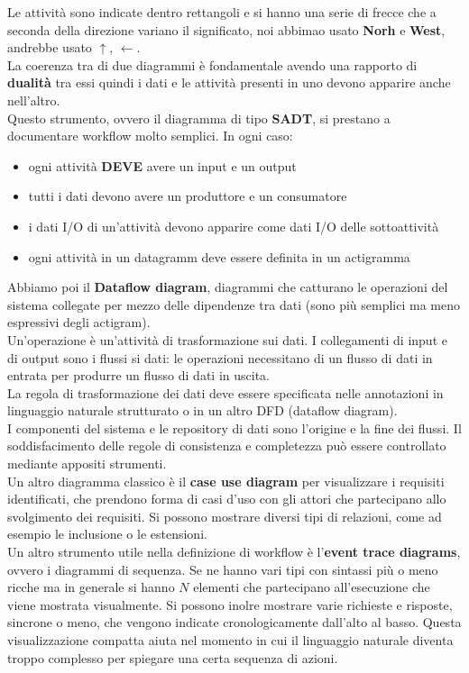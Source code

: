 Le attività sono indicate dentro rettangoli e si hanno una serie di frecce che a seconda della direzione variano il significato, noi abbimao usato \textbf{Norh} e \textbf{West}, andrebbe usato $\uparrow$, $\longleftarrow$.\\
La coerenza tra di due diagrammi è fondamentale avendo una rapporto di \textbf{dualità} tra essi quindi i dati e le attività presenti in uno devono apparire anche nell'altro.\\
Questo strumento, ovvero il diagramma di tipo \textbf{SADT}, si prestano a documentare workflow molto semplici. In ogni caso:
\begin{itemize}
    \item ogni attività \textbf{DEVE} avere un input e un output 
    \item tutti i dati devono avere un produttore e un consumatore 
    \item i dati I/O di un'attività devono apparire come dati I/O delle sottoattività 
    \item ogni attività in un datagramm deve essere definita in un actigramma
\end{itemize}

Abbiamo poi il \textbf{Dataflow diagram}, diagrammi che catturano le operazioni del sistema collegate per mezzo delle dipendenze tra dati (sono più semplici ma meno espressivi degli actigram).\\
Un’operazione è un’attività di trasformazione sui dati. I collegamenti di input e di output sono i flussi si dati: le operazioni necessitano di un flusso di dati in entrata per produrre un flusso di dati in uscita.\\
La regola di trasformazione dei dati deve essere specificata nelle annotazioni in linguaggio naturale strutturato o in un altro DFD (dataflow diagram).\\
I componenti del sistema e le repository di dati sono l’origine e la fine dei flussi.
Il soddisfacimento delle regole di consistenza e completezza può essere controllato mediante appositi strumenti.    \\

Un altro diagramma classico è il \textbf{case use diagram} per visualizzare i requisiti identificati, che prendono forma di casi d'uso con gli attori che partecipano allo svolgimento dei requisiti. Si possono mostrare diversi tipi di relazioni, come ad esempio le inclusione o le estensioni.\\

Un altro strumento utile nella definizione di workflow è l'\textbf{event trace diagrams}, ovvero i diagrammi di sequenza. Se ne hanno vari tipi con sintassi più o meno ricche ma in generale si hanno $N$ elementi che partecipano all'esecuzione che viene mostrata visualmente. Si possono inolre mostrare varie richieste e risposte, sincrone o meno, che vengono indicate cronologicamente dall'alto al basso. Questa visualizzazione compatta aiuta nel momento in cui il linguaggio naturale diventa troppo complesso per spiegare una certa sequenza di azioni. \\

